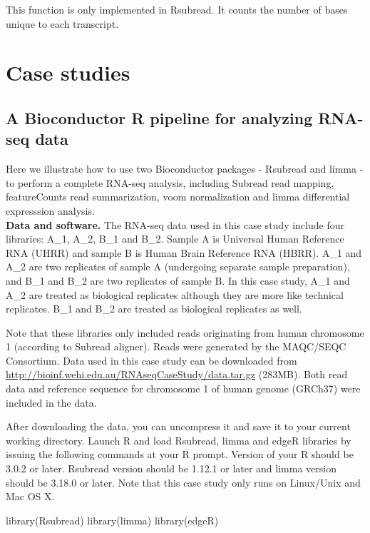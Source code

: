 \documentclass[12pt]{report}
\newcommand{\Subread}{\textsf{Subread}}
\newcommand{\Rsubread}{\textsf{Rsubread}}
\newcommand{\limma}{\textsf{limma}}
\newcommand{\edgeR}{\textsf{edgeR}}
\newcommand{\voom}{\textsf{voom}}
\newcommand{\featureCounts}{\textsf{featureCounts}}
\newcommand{\R}{\textsf{R}}
\begin{document}
This function is only implemented in {\Rsubread}. It counts the number of bases unique to each transcript.

\chapter{Case studies}

\section{A Bioconductor R pipeline for analyzing RNA-seq data}

Here we illustrate how to use two Bioconductor packages - {\Rsubread} and {\limma} - to perform a complete RNA-seq analysis, including {\Subread} read mapping, {\featureCounts} read summarization, {\voom} normalization and {\limma} differential expresssion analysis.\\

{\noindent\bf Data and software.} The RNA-seq data used in this case study include four libraries: A\_1, A\_2, B\_1 and B\_2.
Sample A is Universal Human Reference RNA (UHRR) and sample B is Human Brain Reference RNA (HBRR).
A\_1 and A\_2 are two replicates of sample A (undergoing separate sample preparation), and B\_1 and B\_2 are two replicates of sample B.
In this case study, A\_1 and A\_2 are treated as biological replicates although they are more like technical replicates.
B\_1 and B\_2 are treated as biological replicates as well.

Note that these libraries only included reads originating from human chromosome 1 (according to {\Subread} aligner).
Reads were generated by the MAQC/SEQC Consortium.
Data used in this case study can be downloaded from\\
\url{http://bioinf.wehi.edu.au/RNAseqCaseStudy/data.tar.gz} (283MB).
Both read data and reference sequence for chromosome 1 of human genome (GRCh37) were included in the data.

After downloading the data, you can uncompress it and save it to your current working directory.
Launch {\R} and load {\Rsubread}, {\limma} and {\edgeR} libraries by issuing the following commands at your R prompt.
Version of your {\R} should be 3.0.2 or later.
{\Rsubread} version should be 1.12.1 or later and {\limma} version should be 3.18.0 or later.
Note that this case study only runs on Linux/Unix and Mac OS X.

\begin{Rcode}
library(Rsubread)
library(limma)
library(edgeR)
\end{Rcode}
\end{document}
